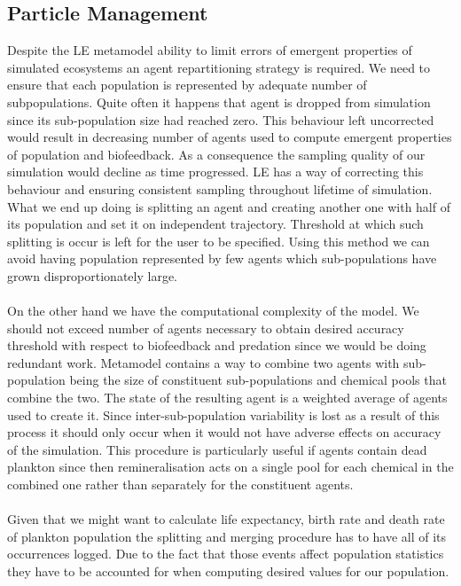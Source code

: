 \documentclass[12pt, a4paper]{report}
\begin{document}
\subsection{Particle Management}\label{sec:pm}
Despite the LE metamodel ability to limit errors of emergent properties of simulated ecosystems an agent
repartitioning strategy is required. We need to ensure that each population is represented by
adequate number of subpopulations. Quite often it happens that agent is dropped from simulation
since its sub-population size had reached zero. This behaviour left uncorrected would result
in decreasing number of agents used to compute emergent properties of population and biofeedback.
As a consequence the sampling quality of our simulation would decline as time progressed.
LE has a way of correcting this behaviour and ensuring consistent sampling throughout lifetime
of simulation. What we end up doing is splitting an agent and creating another one with half of
its population and set it on independent trajectory. Threshold at which such splitting is occur
is left for the user to be specified. Using this method we can avoid having population represented
by few agents which sub-populations have grown disproportionately large.
\\\\
On the other hand we have the computational complexity of the model. We should not exceed number
of agents necessary to obtain desired accuracy threshold with respect to biofeedback and predation
since we would be doing redundant work. Metamodel contains a way to combine two agents
with sub-population being the size of constituent sub-populations and chemical pools that combine the two.
The state of the resulting agent is a weighted average of agents used to create it. Since inter-sub-population
variability is lost as a result of this process it should only occur when it would not have adverse effects
on accuracy of the simulation. This procedure is particularly useful if agents contain dead plankton since then
remineralisation acts on a single pool for each chemical in the combined one rather than separately for the
constituent agents.
\\\\
Given that we might want to calculate life expectancy, birth rate and death rate of plankton population
the splitting and merging procedure has to have all of its occurrences logged. Due to the fact that
those events affect population statistics they have to be accounted for when computing desired values
for our population.
\end{document}
